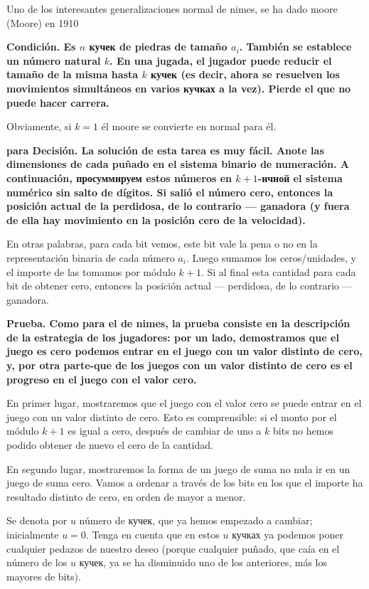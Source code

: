 Uno de los interesantes generalizaciones normal de nimes, se ha dado moore (Moore) en 1910

\bf{Condición}. Es $n$ кучек de piedras de tamaño $a_i$. También se establece un número natural $k$. En una jugada, el jugador puede reducir el tamaño de la misma hasta $k$ кучек (es decir, ahora se resuelven los movimientos simultáneos en varios кучках a la vez). Pierde el que no puede hacer carrera.

Obviamente, si $k=1$ él moore se convierte en normal para él.

\bf{para Decisión}. La solución de esta tarea es muy fácil. Anote las dimensiones de cada puñado en el sistema binario de numeración. A continuación, просуммируем estos números en $k+1$-ичной el sistema numérico sin salto de dígitos. Si salió el número cero, entonces la posición actual de la perdidosa, de lo contrario --- ganadora (y fuera de ella hay movimiento en la posición cero de la velocidad).

En otras palabras, para cada bit vemos, este bit vale la pena o no en la representación binaria de cada número $a_i$. Luego sumamos los ceros/unidades, y el importe de las tomamos por módulo $k+1$. Si al final esta cantidad para cada bit de obtener cero, entonces la posición actual --- perdidosa, de lo contrario --- ganadora.

\bf{Prueba}. Como para el de nimes, la prueba consiste en la descripción de la estrategia de los jugadores: por un lado, demostramos que el juego es cero podemos entrar en el juego con un valor distinto de cero, y, por otra parte-que de los juegos con un valor distinto de cero es el progreso en el juego con el valor cero.

En primer lugar, mostraremos que el juego con el valor cero se puede entrar en el juego con un valor distinto de cero. Esto es comprensible: si el monto por el módulo $k+1$ es igual a cero, después de cambiar de uno a $k$ bits no hemos podido obtener de nuevo el cero de la cantidad.

En segundo lugar, mostraremos la forma de un juego de suma no nula ir en un juego de suma cero. Vamos a ordenar a través de los bits en los que el importe ha resultado distinto de cero, en orden de mayor a menor.

Se denota por $u$ número de кучек, que ya hemos empezado a cambiar; inicialmente $u = 0$. Tenga en cuenta que en estos $u$ кучках ya podemos poner cualquier pedazos de nuestro deseo (porque cualquier puñado, que caía en el número de los $u$ кучек, ya se ha disminuido uno de los anteriores, más los mayores de bits).


